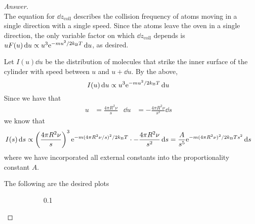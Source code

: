 \documentclass[../psets.tex]{subfiles}
\begin{document}
\begin{enumerate}[label={\textbf{27-\arabic*.}},leftmargin=3.5em]
\begin{proof}[Answer]
\begin{equation*}
        \end{equation*}
        The equation for $\dd{z_\text{coll}}$ describes the collision frequency of atoms moving in a single direction with a single speed. Since the atoms leave the oven in a single direction, the only variable factor on which $\dd{z_\text{coll}}$ depends is $uF(u)\dd{u}\propto u^3\e[-mu^2/2\kB T]\dd{u}$, as desired.\par
        Let $I(u)\dd{u}$ be the distribution of molecules that strike the inner surface of the cylinder with speed between $u$ and $u+\dd{u}$. By the above,
        \begin{equation*}
            I(u)\dd{u} \propto u^3\e[-mu^2/2\kB T]\dd{u}
        \end{equation*}
        Since we have that
        \begin{align*}
            u &= \frac{4\pi R^2\nu}{s}&
            \dd{u} &= -\frac{4\pi R^2\nu}{s^2}\dd{s}
        \end{align*}
        we know that
        \begin{equation*}
            I(s)\dd{s} \propto \left( \frac{4\pi R^2\nu}{s} \right)^3\e[-m(4\pi R^2\nu/s)^2/2\kB T]\cdot -\frac{4\pi R^2\nu}{s^2}\dd{s}
            = \frac{A}{s^5}\e[-m(4\pi R^2\nu)^2/2\kB Ts^2]\dd{s}
        \end{equation*}
        where we have incorporated all external constants into the proportionality constant $A$.\par
        The following are the desired plots
        \begin{figure}[h!]
            \centering
            \begin{subfigure}[b]{0.3\linewidth}
                \centering
                \caption{0.1}
            \end{subfigure}
            \begin{subfigure}[b]{0.3\linewidth}
                \centering
\end{subfigure}
\end{figure}
\end{proof}
\end{enumerate}
\end{document}
